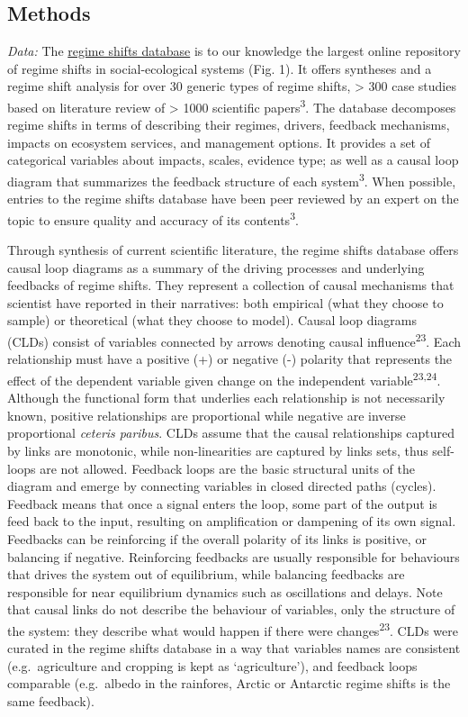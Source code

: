 \documentclass[9pt,]{article}
\begin{document}
\subsection{Methods}\label{methods}

\textit{Data:} The \href{www.regimeshifts.org}{regime shifts database}
is to our knowledge the largest online repository of regime shifts in
social-ecological systems (Fig. 1). It offers syntheses and a regime
shift analysis for over 30 generic types of regime shifts,
\textgreater{} 300 case studies based on literature review of
\textgreater{} 1000 scientific papers\textsuperscript{3}. The database
decomposes regime shifts in terms of describing their regimes, drivers,
feedback mechanisms, impacts on ecosystem services, and management
options. It provides a set of categorical variables about impacts,
scales, evidence type; as well as a causal loop diagram that summarizes
the feedback structure of each system\textsuperscript{3}. When possible,
entries to the regime shifts database have been peer reviewed by an
expert on the topic to ensure quality and accuracy of its
contents\textsuperscript{3}.

Through synthesis of current scientific literature, the regime shifts
database offers causal loop diagrams as a summary of the driving
processes and underlying feedbacks of regime shifts. They represent a
collection of causal mechanisms that scientist have reported in their
narratives: both empirical (what they choose to sample) or theoretical
(what they choose to model). Causal loop diagrams (CLDs) consist of
variables connected by arrows denoting causal
influence\textsuperscript{23}. Each relationship must have a positive
(+) or negative (-) polarity that represents the effect of the dependent
variable given change on the independent
variable\textsuperscript{23,24}. Although the functional form that
underlies each relationship is not necessarily known, positive
relationships are proportional while negative are inverse proportional
\emph{ceteris paribus}. CLDs assume that the causal relationships
captured by links are monotonic, while non-linearities are captured by
links sets, thus self-loops are not allowed. Feedback loops are the
basic structural units of the diagram and emerge by connecting variables
in closed directed paths (cycles). Feedback means that once a signal
enters the loop, some part of the output is feed back to the input,
resulting on amplification or dampening of its own signal. Feedbacks can
be reinforcing if the overall polarity of its links is positive, or
balancing if negative. Reinforcing feedbacks are usually responsible for
behaviours that drives the system out of equilibrium, while balancing
feedbacks are responsible for near equilibrium dynamics such as
oscillations and delays. Note that causal links do not describe the
behaviour of variables, only the structure of the system: they describe
what would happen if there were changes\textsuperscript{23}. CLDs were
curated in the regime shifts database in a way that variables names are
consistent (e.g.~agriculture and cropping is kept as `agriculture'), and
feedback loops comparable (e.g.~albedo in the rainfores, Arctic or
Antarctic regime shifts is the same feedback).
\end{document}

